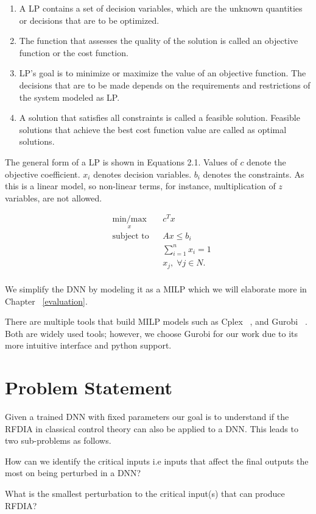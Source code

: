 \begin{enumerate}
	\item A \ac{LP} contains a set of decision variables, which are the unknown quantities or decisions that are to be optimized. 
	\item The function that assesses the quality of the solution is called an objective function or the cost function.
	\item \ac{LP}'s goal is to minimize or maximize the value of an objective function. 
	The decisions that are to be made depends on the requirements and restrictions of the  system modeled as \ac{LP}.
	\item A solution that satisfies all constraints is called a feasible solution. 
	Feasible solutions that achieve the best cost function value are called as optimal solutions. 
\end{enumerate}


The general form of a \ac{LP}  is shown in Equations 2.1. 
Values of $c$ denote the objective coefficient. 
$x_i$ denotes decision variables.
$b_i$ denotes the constraints.
As this is a linear model, so non-linear terms, for instance, multiplication of $z$ variables, are not allowed. 

\begin{equation}
\begin{aligned}
& \underset{x}{\text{min/max}}
& & c^T x \\
& \text{subject to} & &  Ax \leq b_i \\
& & &  \sum_{i=1}^{n} x_i =1 \\
& & &  x_j, \; \forall j \in N. \\
\end{aligned}
\end{equation}


We simplify the \ac{DNN} by modeling it as a \ac{MILP} which we will elaborate more in Chapter ~\ref{evaluation}.  

There are multiple tools that build \ac{MILP} models such as Cplex ~\cite{cplex}, and Gurobi ~\cite{gurobi}.
Both are widely used tools; however, we choose Gurobi for our work due to its more intuitive interface and python support.



\section{Problem Statement}
\label{problemstatement}

Given a trained DNN with fixed parameters our goal is to understand if the  \ac*{RFDIA} in classical control theory can also be applied to a \ac{DNN}.
This leads to two sub-problems as follows.

\begin{problem}
	How can we identify the critical inputs i.e inputs that  affect the final outputs the most on being perturbed in a \ac{DNN}?
\end{problem}

\begin{problem}
	What is the smallest perturbation to the critical input(s) that can produce \ac{RFDIA}?
\end{problem}





